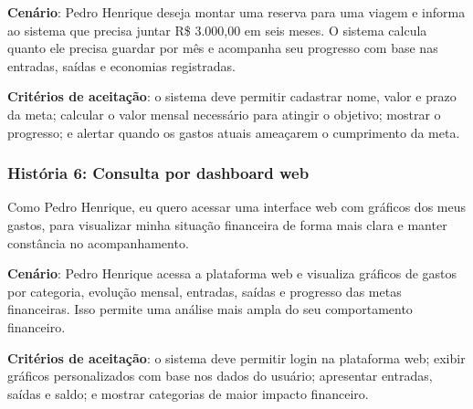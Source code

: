 \textbf{Cenário}: Pedro Henrique deseja montar uma reserva para uma viagem e informa ao sistema que precisa juntar R\$ 3.000,00 em seis meses. O sistema calcula quanto ele precisa guardar por mês e acompanha seu progresso com base nas entradas, saídas e economias registradas.

\textbf{Critérios de aceitação}: o sistema deve permitir cadastrar nome, valor e prazo da meta; calcular o valor mensal necessário para atingir o objetivo; mostrar o progresso; e alertar quando os gastos atuais ameaçarem o cumprimento da meta.

\subsubsection{História 6: Consulta por dashboard web}

Como Pedro Henrique, eu quero acessar uma interface web com gráficos dos meus gastos, para visualizar minha situação financeira de forma mais clara e manter constância no acompanhamento.

\textbf{Cenário}: Pedro Henrique acessa a plataforma web e visualiza gráficos de gastos por categoria, evolução mensal, entradas, saídas e progresso das metas financeiras. Isso permite uma análise mais ampla do seu comportamento financeiro.

\textbf{Critérios de aceitação}: o sistema deve permitir login na plataforma web; exibir gráficos personalizados com base nos dados do usuário; apresentar entradas, saídas e saldo; e mostrar categorias de maior impacto financeiro.

